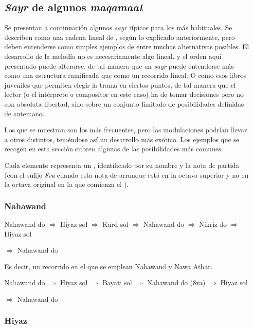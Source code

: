 \subsection{\emph{Sayr} de algunos \emph{maqamaat}}

Se presentan a continuación algunos \emph{sayr} típicos para los \maqamaat más habituales. Se describen como una cadena lineal de \ashnasb, según lo explicado anteriormente, pero deben entenderse como simples ejemplos de entre muchas alternativas posibles. El desarrollo de la melodía no es necesariamente algo lineal, y el orden aquí presentado puede alterarse, de tal manera que un \emph{sayr} puede entenderse más como una estructura ramificada que como un recorrido lineal. O como esos libros juveniles que permiten elegir la trama en ciertos puntos, de tal manera que el lector (o el intérprete o compositor en este caso) ha de tomar decisiones pero no con absoluta libertad, sino sobre un conjunto limitado de posibilidades definidas de antemano.

Los \yins que se muestran son los más frecuentes, pero las modulaciones podrían llevar a otros distintos, teniéndose así un desarrollo más exótico. Los ejemplos que se recogen en esta sección cubren algunas de las posibilidades más comunes.

Cada elemento representa un \yinsb, identificado por su nombre y la nota de partida (con el sufijo \emph{8va} cuando esta nota de arranque está en la octava superior y no en la octava original en la que comienza el \maqamb).

\subsubsection{\Maqam Nahawand}

Nahawand do $\Rightarrow$ Hiyaz sol $\Rightarrow$ Kurd sol $\Rightarrow$ Nahawand do $\Rightarrow$ Nikriz do $\Rightarrow$ Hiyaz sol

$\Rightarrow$ Nahawand do

Es decir, un recorrido en el que se emplean \maqam Nahawand y \maqam Nawa Athar.

Nahawand do $\Rightarrow$ Hiyaz sol $\Rightarrow$ Bayati sol $\Rightarrow$ Nahawand do (8va) $\Rightarrow$ Hiyaz sol

$\Rightarrow$ Nahawand do

\subsubsection{\Maqam Hiyaz}

